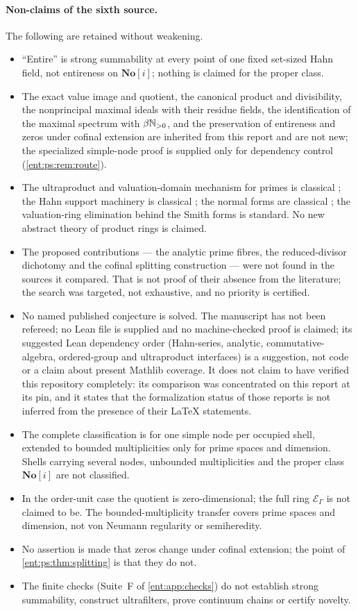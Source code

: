 \documentclass[11pt]{article}
\theoremstyle{plain}
\theoremstyle{plain}
\theoremstyle{plain}
\theoremstyle{definition}
\theoremstyle{definition}
\theoremstyle{definition}
\theoremstyle{definition}
\theoremstyle{remark}
\newcommand{\No}{\mathbf{No}}
\begin{document}
\paragraph{Non-claims of the sixth source.}
The following are retained without weakening.
\begin{itemize}[leftmargin=1.4em]
\item ``Entire'' is strong summability at every point of one fixed set-sized
Hahn field, not entireness on $\No[i]$; nothing is claimed for the proper
class.
\item The exact value image and quotient, the canonical product and
divisibility, the nonprincipal maximal ideals with their residue fields, the
identification of the maximal spectrum with $\beta\mathbb N_{>0}$, and the
preservation of entireness and zeros under cofinal extension are inherited
from this report and are not new; the specialized simple-node proof is
supplied only for dependency control (\cref{ent:ps:rem:route}).
\item The ultraproduct and valuation-domain mechanism for primes is classical
\cite{FFW,StacksValuation}; the Hahn support machinery is classical
\cite{Neumann}; the normal forms are classical \cite{Conway,Gonshor}; the
valuation-ring elimination behind the Smith forms is standard. No new abstract
theory of product rings is claimed.
\item The proposed contributions --- the analytic prime fibres, the
reduced-divisor dichotomy and the cofinal splitting construction --- were
not found in the sources it compared. That is not proof of their absence
from the literature; the search was targeted, not exhaustive, and no
priority is certified.
\item No named published conjecture is solved. The manuscript has not been
refereed; no Lean file is supplied and no machine-checked proof is claimed;
its suggested Lean dependency order (Hahn-series, analytic,
commutative-algebra, ordered-group and ultraproduct interfaces) is a
suggestion, not code or a claim about present Mathlib coverage. It does not
claim to have verified this repository completely: its comparison was
concentrated on this report at its pin, and it states that the formalization
status of those reports is not inferred from the presence of their LaTeX
statements.
\item The complete classification is for one simple node per occupied shell,
extended to bounded multiplicities only for prime spaces and dimension. Shells
carrying several nodes, unbounded multiplicities and the proper class
$\No[i]$ are not classified.
\item In the order-unit case the quotient is zero-dimensional; the full ring
$\mathcal E_\Gamma$ is not claimed to be. The bounded-multiplicity transfer
covers prime spaces and dimension, not von Neumann regularity or
semiheredity.
\item No assertion is made that zeros change under cofinal extension; the
point of \cref{ent:ps:thm:splitting} is that they do not.
\item The finite checks (Suite~F of \cref{ent:app:checks}) do not establish
strong summability, construct ultrafilters, prove continuum chains or certify
novelty.
\end{itemize}
\end{document}
